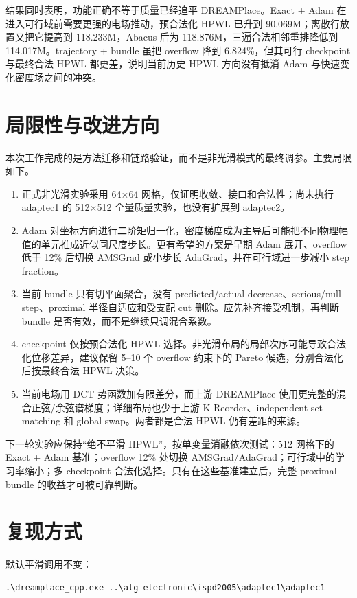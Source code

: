 \documentclass[UTF8,a4paper,11pt]{ctexart}
\begin{document}
结果同时表明，功能正确不等于质量已经追平 DREAMPlace。Exact + Adam 在进入可行域前需要更强的电场推动，预合法化 HPWL 已升到 90.069M；离散行放置又把它提高到 118.233M，Abacus 后为 118.876M，三遍合法相邻重排降低到 114.017M。trajectory + bundle 虽把 overflow 降到 6.824\%，但其可行 checkpoint 与最终合法 HPWL 都更差，说明当前历史 HPWL 方向没有抵消 Adam 与快速变化密度场之间的冲突。

\section{局限性与改进方向}

本次工作完成的是方法迁移和链路验证，而不是非光滑模式的最终调参。主要局限如下。

\begin{enumerate}
  \item 正式非光滑实验采用 64\(\times\)64 网格，仅证明收敛、接口和合法性；尚未执行 adaptec1 的 512\(\times\)512 全量质量实验，也没有扩展到 adaptec2。
  \item Adam 对坐标方向进行二阶矩归一化，密度梯度成为主导后可能把不同物理幅值的单元推成近似同尺度步长。更有希望的方案是早期 Adam 展开、overflow 低于 12\% 后切换 AMSGrad 或小步长 AdaGrad，并在可行域进一步减小 step fraction。
  \item 当前 bundle 只有切平面聚合，没有 predicted/actual decrease、serious/null step、proximal 半径自适应和受支配 cut 删除。应先补齐接受机制，再判断 bundle 是否有效，而不是继续只调混合系数。
  \item checkpoint 仅按预合法化 HPWL 选择。非光滑布局的局部次序可能导致合法化位移差异，建议保留 5--10 个 overflow 约束下的 Pareto 候选，分别合法化后按最终合法 HPWL 决策。
  \item 当前电场用 DCT 势函数加有限差分，而上游 DREAMPlace 使用更完整的混合正弦/余弦谱梯度；详细布局也少于上游 K-Reorder、independent-set matching 和 global swap。两者都是合法 HPWL 仍有差距的来源。
\end{enumerate}

下一轮实验应保持“绝不平滑 HPWL”，按单变量消融依次测试：512 网格下的 Exact + Adam 基准；overflow 12\% 处切换 AMSGrad/AdaGrad；可行域中的学习率缩小；多 checkpoint 合法化选择。只有在这些基准建立后，完整 proximal bundle 的收益才可被可靠判断。

\section{复现方式}

默认平滑调用不变：
\begin{lstlisting}[language={}]
.\dreamplace_cpp.exe ..\alg-electronic\ispd2005\adaptec1\adaptec1
\end{lstlisting}
\end{document}
